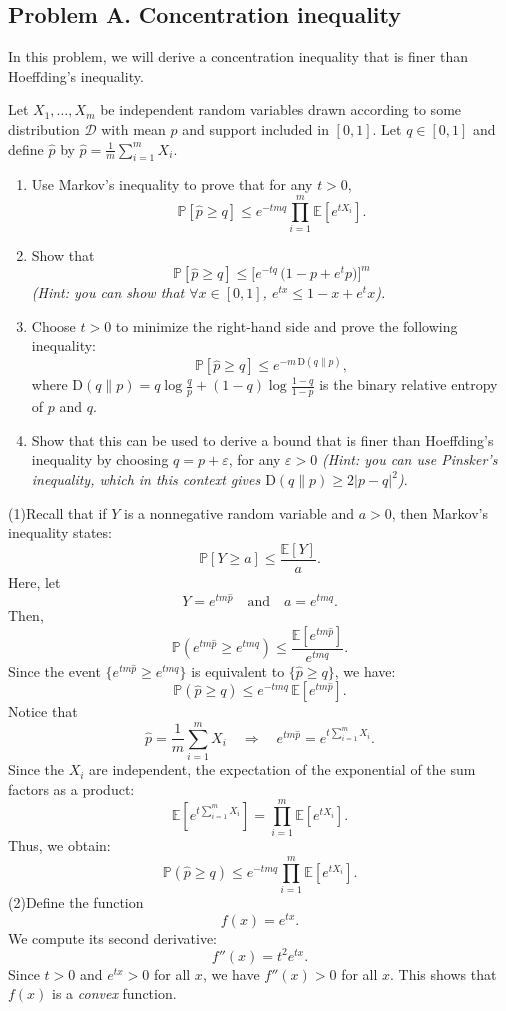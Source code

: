 \documentclass[letterpaper, 11pt]{article}
\newcommand{\E}{\mathbb{E}}     %
\newcommand{\1}{\mathds{1}}	%
\theoremstyle{definition}
\newcommand{\Pp}{\mathbb{P}}
\newcommand{\Dkl}{\mathrm{D}}
\begin{document}
\subsection*{Problem A. Concentration inequality}
In this problem, we will derive a concentration inequality that is finer than Hoeffding's inequality.

Let $X_1,\ldots,X_m$ be independent random variables drawn according to some distribution $\mathcal{D}$ with mean $p$ and support included in $[0,1]$. Let $q\in[0,1]$ and define $\hat p$ by $\hat p=\frac{1}{m}\sum_{i=1}^m X_i$.

\begin{enumerate}[leftmargin=1.2em,label=\arabic*.]
\item Use Markov's inequality to prove that for any $t>0$,
\[
\Pp[\hat p\ge q]\le e^{-tm q}\prod_{i=1}^m \E\!\left[e^{t X_i}\right].
\]

\item Show that
\[
\Pp[\hat p\ge q]\le \bigl[e^{-t q}\,\bigl(1-p+e^{t}p\bigr)\bigr]^m
\]
\emph{(Hint: you can show that $\forall x\in[0,1]$, $e^{t x}\le 1-x+e^{t}x$).}

\item Choose $t>0$ to minimize the right-hand side and prove the following inequality:
\[
\Pp[\hat p\ge q]\le e^{-m\,\Dkl(q\|p)},
\]
where $\Dkl(q\|p)= q\log\frac{q}{p}+(1-q)\log\frac{1-q}{1-p}$ is the binary relative entropy of $p$ and $q$.

\item Show that this can be used to derive a bound that is finer than Hoeffding's inequality by choosing $q=p+\varepsilon$, for any $\varepsilon>0$ \emph{(Hint: you can use Pinsker's inequality, which in this context gives $\Dkl(q\|p)\ge 2|p-q|^2$)}.
\end{enumerate}

(1)Recall that if \(Y\) is a nonnegative random variable and \(a > 0\), then Markov's inequality states:
   \[
   \mathbb{P}[Y \ge a] \le \frac{\mathbb{E}[Y]}{a}.
   \]
   Here, let
   \[
   Y = e^{tm\hat{p}} \quad \text{and} \quad a = e^{tmq}.
   \]
   Then,
   \[
   \mathbb{P}\left(e^{tm\hat{p}} \ge e^{tmq}\right) \le \frac{\mathbb{E}\left[e^{tm\hat{p}}\right]}{e^{tmq}}.
   \]
   Since the event \(\{e^{tm\hat{p}} \ge e^{tmq}\}\) is equivalent to \(\{\hat{p} \ge q\}\), we have:
   \[
   \mathbb{P}\left(\hat{p} \ge q\right) \le e^{-tmq} \, \mathbb{E}\left[e^{tm\hat{p}}\right].
   \]
Notice that
   \[
   \hat{p} = \frac{1}{m} \sum_{i=1}^m X_i \quad \Longrightarrow \quad e^{tm\hat{p}} = e^{t \sum_{i=1}^m X_i}.
   \]
   Since the \(X_i\) are independent, the expectation of the exponential of the sum factors as a product:
   \[
   \mathbb{E} \left[e^{t\sum_{i=1}^m X_i}\right] = \prod_{i=1}^m \mathbb{E} \left[e^{tX_i}\right].
   \]
   Thus, we obtain:
   \[
   \mathbb{P}\left(\hat{p} \ge q\right) \le e^{-tmq} \prod_{i=1}^m \mathbb{E} \left[e^{tX_i}\right].
   \]
(2)Define the function
\[
f(x) = e^{tx}.
\]
We compute its second derivative:
\[
f''(x) = t^2 e^{tx}.
\]
Since \(t > 0\) and \(e^{tx} > 0\) for all \(x\), we have \(f''(x) > 0\) for all \(x\). This shows that \(f(x)\) is a \emph{convex} function.
\end{document}
